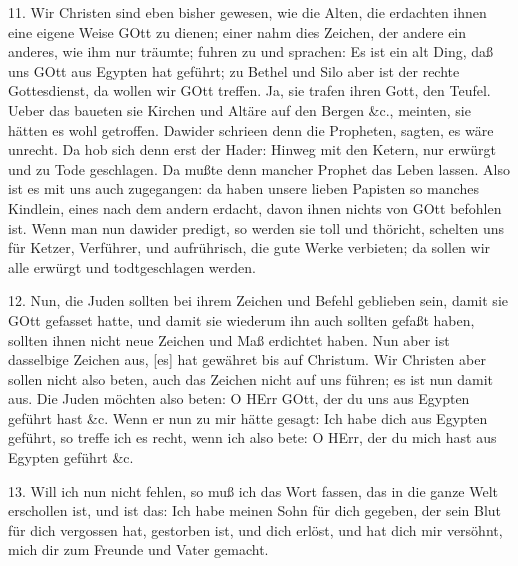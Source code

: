 11. Wir Christen sind eben bisher gewesen, wie die Alten, die erdachten ihnen eine eigene Weise GOtt zu dienen; einer nahm dies Zeichen, der andere ein anderes, wie ihm nur träumte; fuhren zu und sprachen: Es ist ein alt Ding, daß uns GOtt aus Egypten hat geführt; zu Bethel und Silo aber ist der rechte Gottesdienst, da wollen wir GOtt treffen. Ja, sie trafen ihren Gott, den Teufel. Ueber das baueten sie Kirchen und Altäre auf den Bergen \&c., meinten, sie hätten es wohl getroffen. Dawider schrieen denn die Propheten, sagten, es wäre unrecht. Da hob sich denn erst der Hader: Hinweg mit den Ketern, nur erwürgt und zu Tode geschlagen. Da mußte denn mancher Prophet das Leben lassen. Also ist es mit uns auch zugegangen: da haben unsere lieben Papisten so manches Kindlein, eines nach dem andern erdacht, davon ihnen nichts von GOtt befohlen ist. Wenn man nun dawider predigt, so werden sie toll und thöricht, schelten uns für Ketzer, Verführer, und aufrührisch, die gute Werke verbieten; da sollen wir alle erwürgt und todtgeschlagen werden.

12. Nun, die Juden sollten bei ihrem Zeichen und Befehl geblieben sein, damit sie GOtt gefasset hatte, und damit sie wiederum ihn auch sollten gefaßt haben, sollten ihnen nicht neue Zeichen und Maß erdichtet haben. Nun aber ist dasselbige Zeichen aus, [es] hat gewähret bis auf Christum. Wir Christen aber sollen nicht also beten, auch das Zeichen nicht auf uns führen; es ist nun damit aus. Die Juden möchten also beten: O HErr GOtt, der du uns aus Egypten geführt hast \&c. Wenn er nun zu mir hätte gesagt: Ich habe dich aus Egypten geführt, so treffe ich es recht, wenn ich also bete: O HErr, der du mich hast aus Egypten geführt \&c.

13. Will ich nun nicht fehlen, so muß ich das Wort fassen, das in die ganze Welt erschollen ist, und ist das: Ich habe meinen Sohn für dich gegeben, der sein Blut für dich vergossen hat, gestorben ist, und dich erlöst, und hat dich mir versöhnt, mich dir zum Freunde und Vater gemacht.

